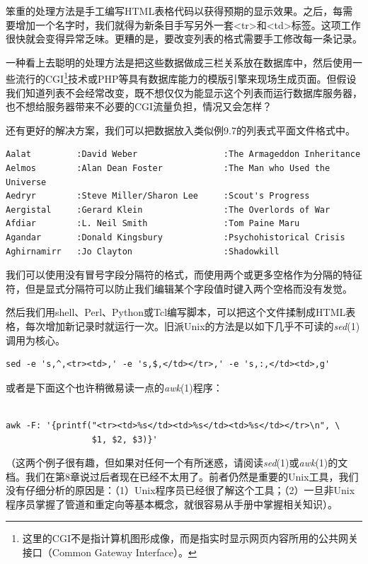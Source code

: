 \documentclass[12pt,oneside]{book}
\begin{document}
笨重的处理方法是手工编写HTML表格代码以获得预期的显示效果。之后，每需要增加一个名字时，我们就得为新条目手写另外一套<tr>和<td>标签。这项工作很快就会变得异常乏味。更糟的是，要改变列表的格式需要手工修改每一条记录。

一种看上去聪明的处理方法是把这些数据做成三栏关系放在数据库中，然后使用一些流行的CGI\footnote{这里的CGI不是指计算机图形成像，而是指实时显示网页内容所用的公共网关接口（Common Gateway Interface）。}技术或PHP等具有数据库能力的模版引擎来现场生成页面。但假设我们知道列表不会经常改变，既不想仅仅为能显示这个列表而运行数据库服务器，也不想给服务器带来不必要的CGI流量负担，情况又会怎样？

还有更好的解决方案，我们可以把数据放入类似例9.7的列表式平面文件格式中。

\begin{Verbatim}[label=例9.7 明星表的主表]
Aalat         :David Weber                 :The Armageddon Inheritance
Aelmos        :Alan Dean Foster            :The Man who Used the Universe 
Aedryr        :Steve Miller/Sharon Lee     :Scout's Progress 
Aergistal     :Gerard Klein                :The Overlords of War 
Afdiar        :L. Neil Smith               :Tom Paine Maru 
Agandar       :Donald Kingsbury            :Psychohistorical Crisis 
Aghirnamirr   :Jo Clayton                  :Shadowkill 
\end{Verbatim}

我们可以使用没有冒号字段分隔符的格式，而使用两个或更多空格作为分隔的特征符，但是显式分隔符可以防止我们编辑某个字段值时键入两个空格而没有发觉。

然后我们用shell、Perl、Python或Tcl编写脚本，可以把这个文件揉制成HTML表格，每次增加新记录时就运行一次。旧派Unix的方法是以如下几乎不可读的\textit{sed}(1)调用为核心。

\begin{Verbatim}
sed -e 's,^,<tr><td>,' -e 's,$,</td></tr>,' -e 's,:,</td><td>,g'
\end{Verbatim}

或者是下面这个也许稍微易读一点的\textit{awk}(1)程序：
\begin{Verbatim}

awk -F: '{printf("<tr><td>%s</td><td>%s</td><td>%s</td></tr>\n", \
                 $1, $2, $3)}'
\end{Verbatim}

（这两个例子很有趣，但如果对任何一个有所迷惑，请阅读\textit{sed}(1)或\textit{awk}(1)的文档。我们在第8章说过后者现在已经不太用了。前者仍然是重要的Unix工具，我们没有仔细分析的原因是：（1）Unix程序员已经很了解这个工具；（2）一旦非Unix程序员掌握了管道和重定向等基本概念，就很容易从手册中掌握相关知识）。
\end{document}
